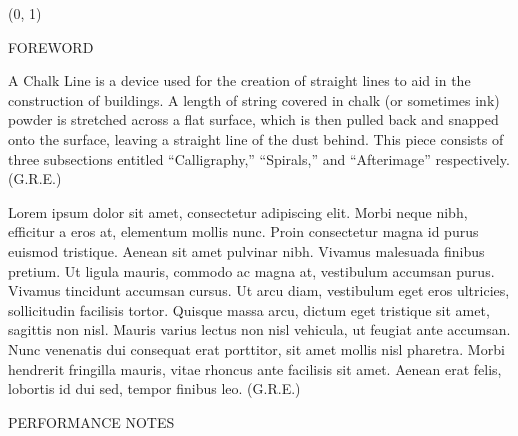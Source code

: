 \documentclass[11pt]{article}
\begin{document}
\begin{textblock}{23}(0, 1)
\begin{center}
\huge FOREWORD
\end{center}
\end{textblock}

\vspace*{0.25\baselineskip}

\begingroup
\begin{center}
A Chalk Line is a device used for the creation of straight lines to aid in the construction of buildings. A length of string covered in chalk (or sometimes ink) powder is stretched across a flat surface, which is then pulled back and snapped onto the surface, leaving a straight line of the dust behind. This piece consists of three subsections entitled ``Calligraphy,'' ``Spirals,'' and ``Afterimage'' respectively.
\rightskip\leftskip
\phantom{text} \hfill (G.R.E.)
\end{center}
\endgroup

\vspace*{0.25\baselineskip}

\begingroup
\begin{center}
Lorem ipsum dolor sit amet, consectetur adipiscing elit. Morbi neque nibh, efficitur a eros at, elementum mollis nunc. Proin consectetur magna id purus euismod tristique. Aenean sit amet pulvinar nibh. Vivamus malesuada finibus pretium. Ut ligula mauris, commodo ac magna at, vestibulum accumsan purus. Vivamus tincidunt accumsan cursus. Ut arcu diam, vestibulum eget eros ultricies, sollicitudin facilisis tortor. Quisque massa arcu, dictum eget tristique sit amet, sagittis non nisl. Mauris varius lectus non nisl vehicula, ut feugiat ante accumsan. Nunc venenatis dui consequat erat porttitor, sit amet mollis nisl pharetra. Morbi hendrerit fringilla mauris, vitae rhoncus ante facilisis sit amet. Aenean erat felis, lobortis id dui sed, tempor finibus leo.
\rightskip\leftskip
\phantom{text} \hfill (G.R.E.)
\end{center}
\endgroup

\vspace*{1.25\baselineskip}

\begin{center}
\huge PERFORMANCE NOTES
\end{center}
\end{document}
